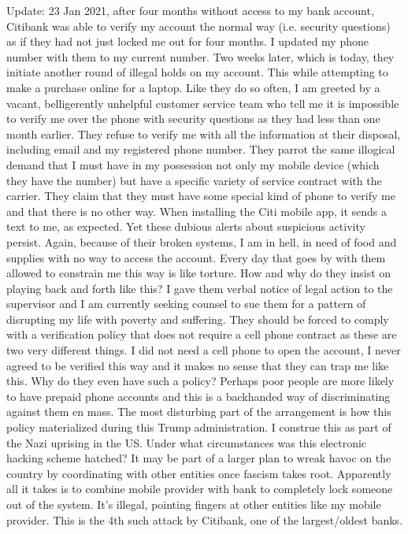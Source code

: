 \documentclass[a4paper]{arthur-letter}
\begin{document}
\begin{letter}
    Update: 23 Jan 2021, after four months without access to my bank account, Citibank was able to verify my account the normal way (i.e. security questions) as if they had not just locked me out for four months. I updated my phone number with them to my current number. Two weeks later, which is today, they initiate another round of illegal holds on my account. This while attempting to make a purchase online for a laptop. Like they do so often, I am greeted by a vacant, belligerently unhelpful customer service team who tell me it is impossible to verify me over the phone with security questions as they had less than one month earlier. They refuse to verify me with all the information at their disposal, including email and my registered phone number. They parrot the same illogical demand that I must have in my possession not only my mobile device (which they have the number) but have a specific variety of service contract with the carrier. They claim that they must have some special kind of phone to verify me and that there is no other way. When installing the Citi mobile app, it sends a text to me, as expected. Yet these dubious alerts about suspicious activity persist. Again, because of their broken systems, I am in hell, in need of food and supplies with no way to access the account. Every day that goes by with them allowed to constrain me this way is like torture. How and why do they insist on playing back and forth like this? I gave them verbal notice of legal action to the supervisor and I am currently seeking counsel to sue them for a pattern of disrupting my life with poverty and suffering. They should be forced to comply with a verification policy that does not require a cell phone contract as these are two very different things. I did not need a cell phone to open the account, I never agreed to be verified this way and it makes no sense that they can trap me like this. Why do they even have such a policy? Perhaps poor people are more likely to have prepaid phone accounts and this is a backhanded way of discriminating against them en mass. The most disturbing part of the arrangement is how this policy materialized during this Trump administration. I construe this as part of the Nazi uprising in the US. Under what circumstances was this electronic hacking scheme hatched? It may be part of a larger plan to wreak havoc on the country by coordinating with other entities once fascism takes root. Apparently all it takes is to combine mobile provider with bank to completely lock someone out of the system. It's illegal, pointing fingers at other entities like my mobile provider. This is the 4th such attack by Citibank, one of the largest/oldest banks.
    

\end{letter}
\end{document}
